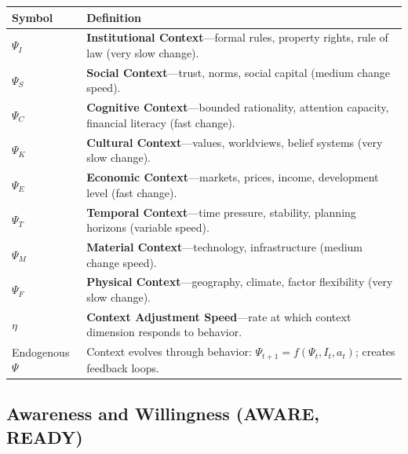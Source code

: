 \begin{longtable}{@{}p{2.8cm}p{10cm}@{}}
\toprule
\textbf{Symbol} & \textbf{Definition} \\
\midrule
\endhead
$\Psi_I$ & \textbf{Institutional Context}---formal rules, property rights, rule of law (very slow change). \\[6pt]
$\Psi_S$ & \textbf{Social Context}---trust, norms, social capital (medium change speed). \\[6pt]
$\Psi_C$ & \textbf{Cognitive Context}---bounded rationality, attention capacity, financial literacy (fast change). \\[6pt]
$\Psi_K$ & \textbf{Cultural Context}---values, worldviews, belief systems (very slow change). \\[6pt]
$\Psi_E$ & \textbf{Economic Context}---markets, prices, income, development level (fast change). \\[6pt]
$\Psi_T$ & \textbf{Temporal Context}---time pressure, stability, planning horizons (variable speed). \\[6pt]
$\Psi_M$ & \textbf{Material Context}---technology, infrastructure (medium change speed). \\[6pt]
$\Psi_F$ & \textbf{Physical Context}---geography, climate, factor flexibility (very slow change). \\[6pt]
$\eta$ & \textbf{Context Adjustment Speed}---rate at which context dimension responds to behavior. \\[6pt]
Endogenous $\Psi$ & Context evolves through behavior: $\Psi_{t+1} = f(\Psi_t, I_t, a_t)$; creates feedback loops. \\
\bottomrule
\end{longtable}

\subsection{Awareness and Willingness (AWARE, READY)}

